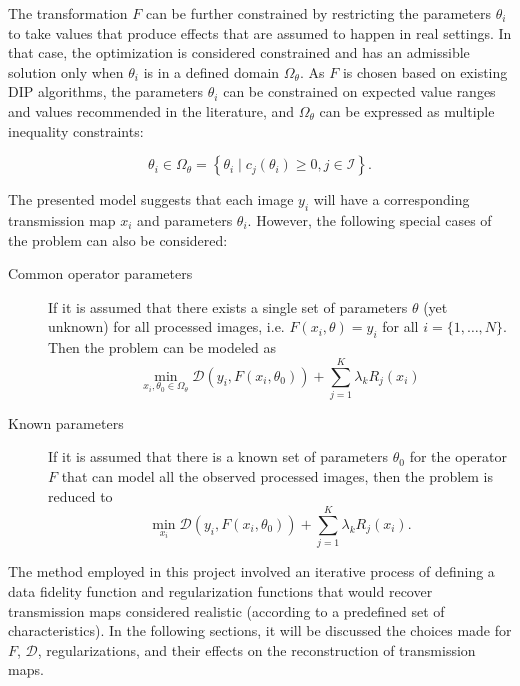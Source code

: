 \documentclass[nomenclature, english, bibtex]{kththesis}
\numberwithin{listing}{chapter}
\begin{document}
The transformation $F$ can be further constrained by restricting the parameters $\theta_i$ to take values
that produce effects that are assumed to happen in real settings. In that case, the optimization is considered
constrained and has an admissible solution only when $\theta_i$ is in a defined domain $\Omega_\theta$.
As $F$ is chosen based on existing \acrshort{DIP} algorithms, the parameters $\theta_i$ can be constrained
on expected value ranges and values recommended in the literature, and $\Omega_\theta$ can be expressed as
multiple inequality constraints:

\begin{equation}
    \theta_i \in \Omega_\theta = \left\{ \theta_i \mid c_j(\theta_i) \geq 0, j \in \mathcal{I}  \right\}.
\end{equation}

The presented model suggests that each image $y_i$ will have a corresponding transmission map $x_i$ and
parameters $\theta_i$. However, the following special cases of the problem can also be considered:

\begin{description}
    \item[Common operator parameters] If it is assumed that there exists a single set of parameters $\theta$
    (yet unknown) for all processed images, i.e. $F(x_i, \theta) = y_i$ for all $i = \{1,\dots,N\}$.
    Then the problem can be modeled as
    \begin{equation}
        \min_{x_i, \theta_0 \in \Omega_\theta}  \mathcal{D}(y_i, F(x_i, \theta_0)) + \sum_{j = 1}^{K} \lambda_k R_j(x_i)
    \end{equation}
    \item[Known parameters] If it is assumed that there is a known set of parameters $\theta_0$ for the operator
    $F$ that can model all the observed processed images, then the problem is reduced to
    \begin{equation}
        \min_{x_i}  \mathcal{D}(y_i, F(x_i, \theta_0)) + \sum_{j = 1}^{K} \lambda_k R_j(x_i).
    \end{equation}
\end{description}


The method employed in this project involved an iterative process of defining a data fidelity function and
regularization functions that would recover transmission maps considered realistic (according to a predefined
set of characteristics). In the following sections, it will be discussed the choices made for
$F$, $\mathcal{D}$, regularizations, and their effects on the reconstruction of transmission maps.
\end{document}
